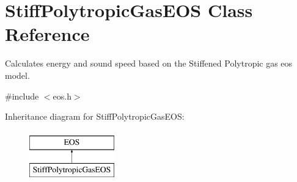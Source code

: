 \hypertarget{classStiffPolytropicGasEOS}{\section{Stiff\-Polytropic\-Gas\-E\-O\-S Class Reference}
\label{classStiffPolytropicGasEOS}
}


Calculates energy and sound speed based on the Stiffened Polytropic gas eos model.  




{\ttfamily \#include $<$eos.\-h$>$}

Inheritance diagram for Stiff\-Polytropic\-Gas\-E\-O\-S\-:\begin{figure}[H]
\begin{center}
\leavevmode
\includegraphics[height=2.000000cm]{classStiffPolytropicGasEOS}
\end{center}
\end{figure}
